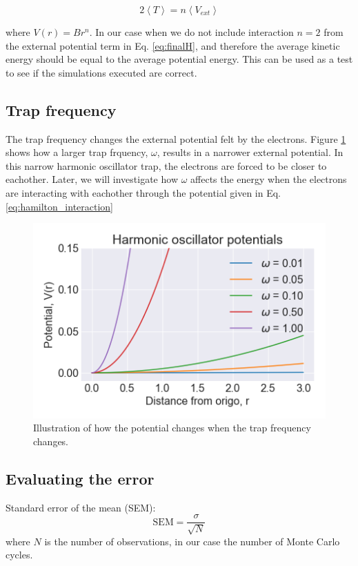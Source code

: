 \begin{equation}\label{eq:virial_theorem}
2\left< T\right> = n\left< V_{ext}\right>
\end{equation}

where $V(r) = Br^n$. In our case when we do not include interaction $n = 2$ from the external potential term in Eq. \ref{eq:finalH}, and therefore the average kinetic energy should be equal to the average potential energy. This can be used as a test to see if the simulations executed are correct. 

\subsection{Trap frequency}

The trap frequency changes the external potential felt by the electrons. Figure \ref{fig:harmonic_oscillator_potential} shows how a larger trap frquency, $\omega$, results in a narrower external potential. In this narrow harmonic oscillator trap, the electrons are forced to be closer to eachother. Later, we will investigate how $\omega$ affects the energy when the electrons are interacting with eachother through the potential given in Eq. \ref{eq:hamilton_interaction}

\begin{figure}[H]
\center
\includegraphics[width=0.5\linewidth]{../Results/harmonic_oscialltor_potentials}\caption{Illustration of how the potential changes when the trap frequency changes. }\label{fig:harmonic_oscillator_potential}
\end{figure}

\subsection{Evaluating the error}

Standard error of the mean (SEM):
\begin{equation}
\text{SEM} = \frac{\sigma}{\sqrt{N}}
\end{equation}
where $N$ is the number of observations, in our case the number of Monte Carlo cycles.